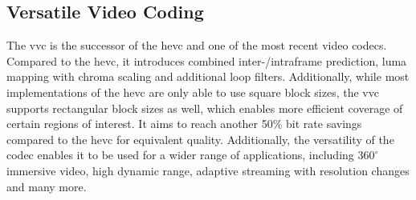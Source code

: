 \subsection{Versatile Video Coding}
\label{subsec:vvc}

The \gls{vvc} \cite{vvc_2021} is the successor of the \gls{hevc} and one of the most recent video codecs.
Compared to the \gls{hevc}, it introduces combined inter-/intraframe prediction, luma mapping with chroma scaling and additional loop filters.
Additionally, while most implementations of the \gls{hevc} are only able to use square block sizes, the \gls{vvc} supports rectangular block sizes as well, which enables more efficient coverage of certain regions of interest.
It aims to reach another 50\% bit rate savings compared to the \gls{hevc} for equivalent quality.
Additionally, the versatility of the codec enables it to be used for a wider range of applications, including $360^{\circ}$ immersive video, high dynamic range, adaptive streaming with resolution changes and many more.

